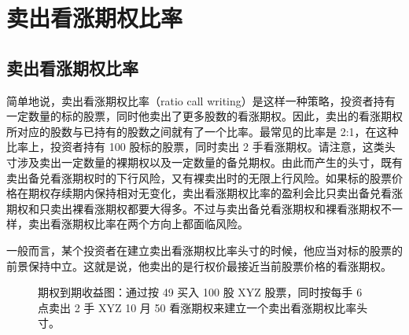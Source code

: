 \chapter{卖出看涨期权比率}
\section{卖出看涨期权比率}
简单地说，卖出看涨期权比率（ratio call writing）是这样一种策略，投资者持有一定数量的标的股票，同时他卖出了更多股数的看涨期权。因此，卖出的看涨期权所对应的股数与已持有的股数之间就有了一个比率。最常见的比率是 2:1，在这种比率上，投资者持有 100 股标的股票，同时卖出 2 手看涨期权。请注意，这类头寸涉及卖出一定数量的裸期权以及一定数量的备兑期权。由此而产生的头寸，既有卖出备兑看涨期权时的下行风险，又有裸卖出时的无限上行风险。如果标的股票价格在期权存续期内保持相对无变化，卖出看涨期权比率的盈利会比只卖出备兑看涨期权和只卖出裸看涨期权都要大得多。不过与卖出备兑看涨期权和裸看涨期权不一样，卖出看涨期权比率在两个方向上都面临风险。

一般而言，某个投资者在建立卖出看涨期权比率头寸的时候，他应当对标的股票的前景保持中立。这就是说，他卖出的是行权价最接近当前股票价格的看涨期权。
\begin{figure}
    \centering
    \caption{期权到期收益图：通过按 49 买入 100 股 XYZ 股票，同时按每手 6 点卖出 2 手 XYZ 10 月 50 看涨期权来建立一个卖出看涨期权比率头寸。}
\end{figure}

